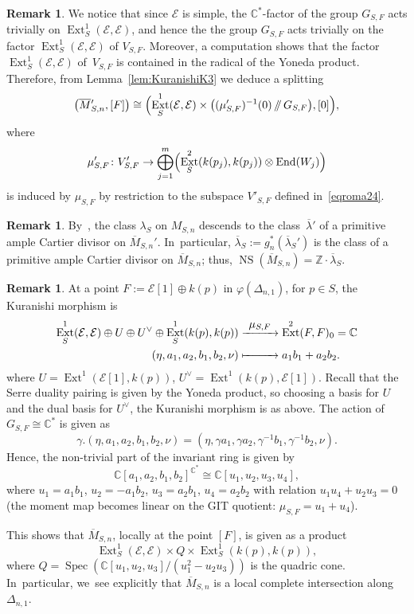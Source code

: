 \documentclass[11pt]{article}
\newcommand\To[1]{\mathchoice{\xrightarrow{\textstyle\kern4pt#1\kern3pt}}{\stackrel{#1}{\longrightarrow}}{}{}}
\newcommand\Mto[1]{\mathrel{\mapstochar\To{#1}}}
\providecommand\sslash{\mathop{/\mkern-5.5mu/}}
\newcommand{\CC}{{\mathbb C}}\let\C\CC
\newcommand{\ZZ}{{\mathbb Z}}\let\Z\ZZ
\newcommand\cE{\mathcal{E}}
\DeclareMathOperator{\End}{End}
\DeclareMathOperator{\Ext}{Ext}
\DeclareMathOperator{\NS}{NS}
\DeclareMathOperator{\Spec}{Spec}
\let\phi\varphi
\theoremstyle{definition}
\newtheorem{rema}[lemm]{Remark}
\begin{document}
\begin{rema}\label{rmk:SplitKuranishi}
We notice that since $\cE$ is simple, the $\CC^*$-factor of the group $G_{S,F}$ acts trivially on $\Ext^1_S(\cE,\cE)$, and hence the the group $G_{S,F}$ acts trivially on the factor $\Ext^1_S(\cE,\cE)$ of $V_{S,F}$.
Moreover, a computation shows that the factor $\Ext^1_S(\cE,\cE)$ of~$V_{S,F}$ is contained in the radical of the Yoneda product.
Therefore, from Lemma~\ref{lem:KuranishiK3} we deduce a splitting
\begin{equation*}\label{eq:SplittingK3}
\left(\overline{M}{}_{S,n}',[F]\right)\cong \Bigl(\Ext^1_S(\cE,\cE)\times \bigl((\mu_{S,F}')^{-1}(0)\sslash G_{S,F}\bigr),[0]\Bigr),
\end{equation*}
where
\[
\mu_{S,F}'\colon V_{S,F}'\to \bigoplus_{j=1}^m \Bigl(\Ext^2_S(k(p_j),k(p_j))\otimes \End(W_j) \Bigr)
\]
is induced by $\mu_{S,F}$ by restriction to the subspace $V'_{S,F}$ defined in~\eqref{eqroma24}.
\end{rema}

\begin{rema}\label{rmk:AmpleLineBundleDUYK3}
By~\cite[Th.\,21.25]{BLMNPS:family}, the class $\lambda_S$ on $M_{S,n}$ descends to the class~$\overline{\lambda}{}'$ of a primitive ample Cartier divisor on $\overline{M}{}_{S,n}'$. In~particular, $\overline{\lambda}{}_S:=g_n^*(\overline{\lambda}{}_S')$ is the class of a primitive ample Cartier divisor on $\overline{M}_{S,n}$; thus, $\NS(\overline{M}_{S,n})=\ZZ \cdot \overline{\lambda}{}_S$.
\end{rema}

\begin{rema}\label{rmk:KuranishiDelta1}
At a point $F:=\cE[1] \oplus k(p)$ in $\phi(\Delta_{n,1})$, for $p\in S$, the Kuranishi morphism is
\[
\begin{aligned}
\Ext^1_S(\cE,\cE) \oplus U \oplus U^\vee \oplus \Ext^1_S(k(p),k(p)) & \To{\mu_{S,F}} \Ext^2(F,F)_0=\CC\\
(\eta, a_1,a_2,b_1,b_2, \nu) & \Mto{\hphantom{\mu_{S,F}}} a_1b_1+a_2b_2.
\end{aligned}
\]
where $U=\Ext^1(\cE[1],k(p))$, $U^\vee=\Ext^1(k(p),\cE[1])$. Recall that the Serre duality pairing is given by the Yoneda product, so choosing a basis for $U$ and the dual basis for $U^\vee$, the Kuranishi morphism is as above.
The action of $G_{S,F}\cong\CC^*$ is given as
\[
\gamma.(\eta,a_1,a_2,b_1,b_2,\nu)=(\eta,\gamma a_1,\gamma a_2,\gamma^{-1} b_1, \gamma^{-1} b_2,\nu).
\]
Hence, the non-trivial part of the invariant ring is given by
\[
\CC[a_1,a_2,b_1,b_2]^{\CC^*} \cong \CC[u_1,u_2,u_3,u_4],
\]
where $u_1=a_1b_1$, $u_2=-a_1b_2$, $u_3=a_2b_1$, $u_4=a_2b_2$ with relation $u_1u_4+u_2u_3=0$ (the moment map becomes linear on the GIT quotient: $\mu_{S,F}=u_1+u_4$).

This shows that $\overline{M}_{S,n}$, locally at the point $[F]$, is given as a product
\[
\Ext^1_S(\cE,\cE)\times Q \times \Ext^1_S(k(p),k(p)),
\]
where $Q=\Spec(\CC[u_1,u_2,u_3]/(u_1^2-u_2u_3))$ is the quadric cone. In~particular, we~see explicitly that $\overline{M}_{S,n}$ is a local complete intersection along $\Delta_{n,1}$.
\end{rema}
\end{document}
